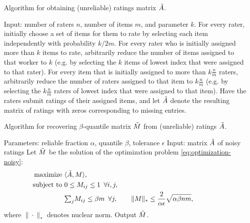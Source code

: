 \begin{algorithm}[b!]
\caption{Algorithm for obtaining (unreliable) ratings matrix $\tilde{A}$.}
\label{alg:create-A}
\begin{algorithmic}[1]
\State Input: number of raters $n$,  number of items $m$, and parameter $k$.
\State For every rater, initially choose a set of items for them to rate by selecting each item independently with probability $k/2m$.  
\State For every rater who is initially assigned more than $k$ items to rate, arbitrarily reduce the number of items assigned to that worker to $k$ (e.g. by selecting the $k$ items of lowest index that were assigned to that rater).
\State For every item that is initially assigned to more than $k\frac{n}{m}$ raters, arbitrarily reduce the number of raters assigned to that item to $k \frac{n}{m}$ (e.g. by selecting the $k \frac{n}{m}$ raters of lowest index that were assigned to that item).
\State Have the raters submit ratings of their assigned items, and let $\tilde{A}$ denote the resulting matrix of ratings with zeros corresponding to missing entries.
\end{algorithmic}
\end{algorithm}


\begin{algorithm}[b!]
\caption{Algorithm for recovering $\beta$-quantile matrix $\tilde{M}$ from 
(unreliable) ratings $\tilde{A}$.}
\label{alg:recover-M}
\begin{algorithmic}[1]
\State Parameters: reliable fraction $\alpha$, quantile $\beta$, tolerance $\epsilon$
\State Input: matrix $\tilde{A}$ of noisy ratings
\State Let $\tilde{M}$ be the solution of the optimization problem \eqref{eq:optimization-noisy}:
  \begin{align}
  \label{eq:optimization-noisy}
  \text{maximize } &\langle \tilde{A}, M \rangle, \\
  \notag \text{ subject to } &0 \leq M_{ij} \leq 1 \,\,\, \forall i,j, \\
  \notag                     &{\textstyle \sum_{j}} M_{ij} \leq \beta m \,\,\, \forall j, \quad\quad
                      \|M\|_* \leq \frac{2}{\alpha\epsilon}\sqrt{\alpha\beta nm}, \phantom{xxxxxxx}
  \end{align}
  where $\|\cdot\|_*$ denotes nuclear norm.
\State Output $\tilde{M}$.
\end{algorithmic}
\end{algorithm}
